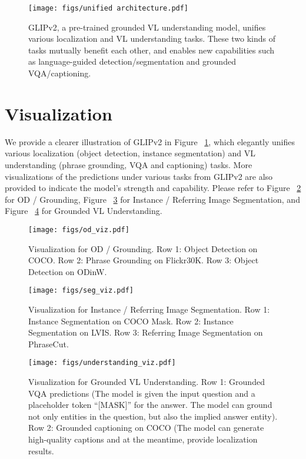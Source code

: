 \documentclass{article}
\newcommand{\our}{GLIPv2\xspace}
\begin{document}
\begin{figure}[ht]
    \centering
    \texttt{[image: figs/unified architecture.pdf]}
    \caption{GLIPv2, a pre-trained grounded VL understanding model, unifies various localization and VL understanding tasks. These two kinds of tasks mutually benefit each other, and enables new capabilities such as language-guided detection/segmentation and grounded VQA/captioning.}
    \label{fig:big_unfied_model}
\end{figure}

\section{Visualization}
\label{sec:viz}
We provide a clearer illustration of \our in Figure ~\ref{fig:big_unfied_model}, which elegantly unifies various localization (object detection, instance segmentation) and VL understanding (phrase grounding, VQA and captioning) tasks. More visualizations of the predictions under various tasks from \our are also provided to indicate the model's strength and capability. Please refer to Figure ~\ref{fig:examples_1} for OD / Grounding, Figure ~\ref{fig:examples_2} for Instance / Referring Image Segmentation, and Figure ~\ref{fig:examples_3} for Grounded VL Understanding. 

\begin{figure}[h]
\centering
\texttt{[image: figs/od\_viz.pdf]} \\
\caption{ Visualization for OD / Grounding. Row 1: Object Detection on COCO. Row 2: Phrase Grounding on Flickr30K. Row 3: Object Detection on ODinW.}
\label{fig:examples_1}
\end{figure}

\begin{figure}[h]
\centering
\texttt{[image: figs/seg\_viz.pdf]}
\caption{ Visualization for Instance / Referring Image Segmentation. Row 1: Instance Segmentation on COCO Mask. Row 2: Instance Segmentation on LVIS. Row 3: Referring Image Segmentation on PhraseCut.}
\label{fig:examples_2}
\end{figure}

\begin{figure}[h]
\centering
\texttt{[image: figs/understanding\_viz.pdf]}
\caption{ Visualization for Grounded VL Understanding. Row 1: Grounded VQA predictions (The model is given the input question and a placeholder token ``[MASK]'' for the answer. The model can ground not only entities in the question, but also the implied answer entity). Row 2: Grounded captioning on COCO (The model can generate high-quality captions and at the meantime, provide localization results.}
\label{fig:examples_3}
\end{figure}
\end{document}
